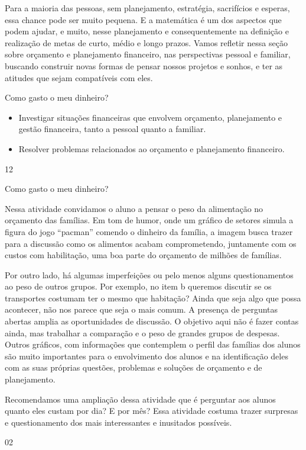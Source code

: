 Para a maioria das pessoas, sem planejamento, estratégia, sacrifícios e esperas, essa chance pode ser muito pequena. E a matemática é um dos aspectos que podem ajudar, e muito, nesse planejamento e consequentemente na definição e realização de metas de curto, médio e longo prazos. Vamos refletir nessa seção sobre orçamento e planejamento financeiro, nas perspectivas pessoal e familiar, buscando construir novas formas de pensar nossos projetos e sonhos, e ter as atitudes que sejam compatíveis com eles.
\clearpage
\begin{objectives}{Como gasto o meu dinheiro?}
{
\begin{itemize}
\item Investigar situações financeiras que envolvem orçamento, planejamento e gestão financeira, tanto a pessoal quanto a familiar.
\item Resolver problemas relacionados ao orçamento e planejamento financeiro. 
\end{itemize}
}{1}{2}
\end{objectives}
\begin{sugestions}{Como gasto o meu dinheiro?}
{
Nessa atividade convidamos o aluno a pensar o peso da alimentação no orçamento das famílias. Em tom de humor, onde um gráfico de setores simula a figura do jogo “pacman” comendo o dinheiro da família, a imagem busca trazer para a discussão como os alimentos acabam comprometendo, juntamente com os custos com habilitação, uma boa parte do orçamento de milhões de famílias. 

Por outro lado, há algumas imperfeições ou pelo menos alguns questionamentos ao peso de outros grupos. Por exemplo, no item b queremos discutir se os transportes costumam ter o mesmo que habitação? Ainda que seja algo que possa acontecer, não nos parece que seja o mais comum. A presença de perguntas abertas amplia as oportunidades de discussão. O objetivo aqui não é fazer contas ainda, mas trabalhar a comparação e o peso de grandes grupos de despesas. Outros gráficos, com informações que contemplem o perfil das famílias dos alunos são muito importantes para o envolvimento dos alunos e na identificação deles com as suas próprias questões, problemas e soluções de orçamento e de planejamento.

Recomendamos uma ampliação dessa atividade que é perguntar aos alunos quanto eles custam por dia? E por mês? Essa atividade costuma trazer surpresas e questionamento dos mais interessantes e inusitados possíveis.

}{0}{2}
\end{sugestions}
